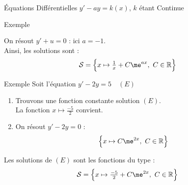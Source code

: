 \documentclass{cours}
\begin{document}
\begin{Gpartie}{Équations Différentielles $y'-ay=k(x)$, $k$ étant Continue}
\begin{Spartie}{Exemple}
\begin{enumerate}
                On résout $y'+u=0$ : ici $a=-1$. \\
                Ainsi, les solutions sont :
                \[\mathcal{S}=\Big\{x\mapsto\tfrac{1}{x}+C\me^{ax},\ C\in\mathbb{R}\Big\}\]
            \end{enumerate}
        \end{Spartie}
        \begin{Spartie}{Exemple} 
            Soit l'équation $y'-2y=5\quad(E)$
            \begin{enumerate}
                \item Trouvons une fonction constante solution $(E)$. \\
                La fonction $x\mapsto\frac{-5}{2}$ convient.
                \item On résout $y'-2y=0$ :
                \[\Big\{x\mapsto C\me^{2x},\ C\in\mathbb{R}\Big\}\]
            \end{enumerate}

            Les solutions de $(E)$ sont les fonctions du type :
            \[\mathcal{S}=\Big\{x\mapsto\tfrac{-5}{2}+C\me^{2x},\ C\in\mathbb{R}\Big\}\]
        \end{Spartie}
    \end{Gpartie}
\end{document}
